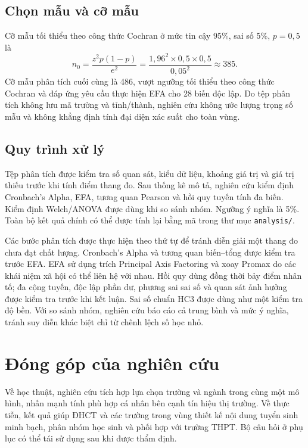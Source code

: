 \subsection{Chọn mẫu và cỡ mẫu}
Cỡ mẫu tối thiểu theo công thức Cochran ở mức tin cậy 95\%, sai số 5\%, $p=0{,}5$ là
\begin{equation}n_0=\frac{z^2p(1-p)}{e^2}=\frac{1{,}96^2\times0{,}5\times0{,}5}{0{,}05^2}\approx385.\end{equation}
Cỡ mẫu phân tích cuối cùng là 486, vượt ngưỡng tối thiểu theo công thức Cochran và đáp ứng yêu cầu thực hiện EFA cho 28 biến độc lập. Do tệp phân tích không lưu mã trường và tỉnh/thành, nghiên cứu không ước lượng trọng số mẫu và không khẳng định tính đại diện xác suất cho toàn vùng.

\subsection{Quy trình xử lý}
Tệp phân tích được kiểm tra số quan sát, kiểu dữ liệu, khoảng giá trị và giá trị thiếu trước khi tính điểm thang đo. Sau thống kê mô tả, nghiên cứu kiểm định Cronbach's Alpha, EFA, tương quan Pearson và hồi quy tuyến tính đa biến. Kiểm định Welch/ANOVA được dùng khi so sánh nhóm. Ngưỡng ý nghĩa là 5\%. Toàn bộ kết quả chính có thể được tính lại bằng mã trong thư mục \texttt{analysis/}.

Các bước phân tích được thực hiện theo thứ tự để tránh diễn giải một thang đo chưa đạt chất lượng. Cronbach's Alpha và tương quan biến--tổng được kiểm tra trước EFA. EFA sử dụng trích Principal Axis Factoring và xoay Promax do các khái niệm xã hội có thể liên hệ với nhau. Hồi quy dùng đồng thời bảy điểm nhân tố; đa cộng tuyến, độc lập phần dư, phương sai sai số và quan sát ảnh hưởng được kiểm tra trước khi kết luận. Sai số chuẩn HC3 được dùng như một kiểm tra độ bền. Với so sánh nhóm, nghiên cứu báo cáo cả trung bình và mức ý nghĩa, tránh suy diễn khác biệt chỉ từ chênh lệch số học nhỏ.

\section{Đóng góp của nghiên cứu}
Về học thuật, nghiên cứu tích hợp lựa chọn trường và ngành trong cùng một mô hình, nhấn mạnh tính phù hợp cá nhân bên cạnh tín hiệu thị trường. Về thực tiễn, kết quả giúp ĐHCT và các trường trong vùng thiết kế nội dung tuyển sinh minh bạch, phân nhóm học sinh và phối hợp với trường THPT. Bộ câu hỏi ở phụ lục có thể tái sử dụng sau khi được thẩm định.


